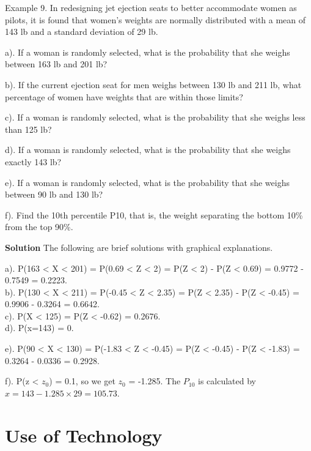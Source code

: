 \documentclass[
]{book}
\begin{document}
\hfill\break

Example 9. In redesigning jet ejection seats to better accommodate women as pilots, it is found that women's weights are normally distributed with a mean of 143 lb and a standard deviation of 29 lb.

a). If a woman is randomly selected, what is the probability that she weighs between 163 lb and 201 lb?

b). If the current ejection seat for men weighs between 130 lb and 211 lb, what percentage of women have weights that are within those limits?

c). If a woman is randomly selected, what is the probability that she weighs less than 125 lb?

d). If a woman is randomly selected, what is the probability that she weighs exactly 143 lb?

e). If a woman is randomly selected, what is the probability that she weighs between 90 lb and 130 lb?

f). Find the 10th percentile P10, that is, the weight separating the bottom 10\% from the top 90\%.

\textbf{Solution} The following are brief solutions with graphical explanations.

a). P(163 \textless{} X \textless{} 201) = P(0.69 \textless{} Z \textless{} 2) = P(Z \textless{} 2) - P(Z \textless{} 0.69) = 0.9772 - 0.7549 = 0.2223.\\

b). P(130 \textless{} X \textless{} 211) = P(-0.45 \textless{} Z \textless{} 2.35) = P(Z \textless{} 2.35) - P(Z \textless{} -0.45) = 0.9906 - 0.3264 = 0.6642.\\

c). P(X \textless{} 125) = P(Z \textless{} -0.62) = 0.2676.\\

d). P(x=143) = 0.

e). P(90 \textless{} X \textless{} 130) = P(-1.83 \textless{} Z \textless{} -0.45) = P(Z \textless{} -0.45) - P(Z \textless{} -1.83) = 0.3264 - 0.0336 = 0.2928.

\hfill\break

f). P(z \textless{} \(z_0\)) = 0.1, so we get \(z_0\) = -1.285. The \(P_{10}\) is calculated by \(x = 143-1.285\times 29 = 105.73\).

\hfill\break

\hypertarget{use-of-technology-2}{%
\section{Use of Technology}\label{use-of-technology-2}}
\end{document}
